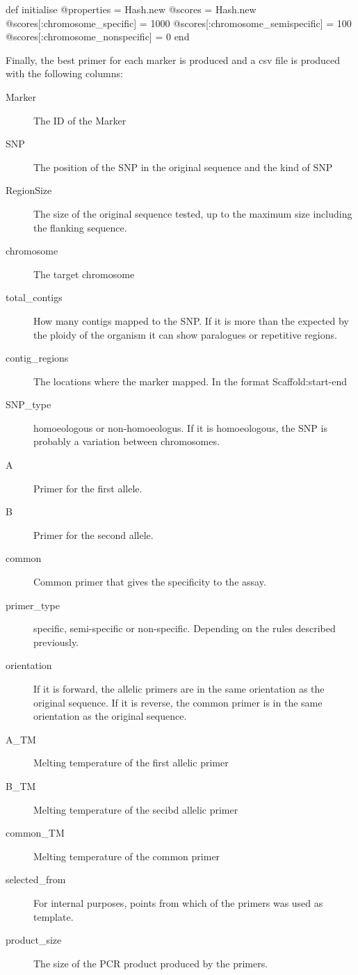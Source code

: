 \begin{code}[language=Ruby,caption={[\texttt{Bio::DB::Primer3::Primer3Record.initialize}]Initialisation of the \texttt{Bio::DB::Primer3::Primer3Record} class, including the default score weights}, label=lst:poly:defScore]
def initialise
  @properties = Hash.new
  @scores = Hash.new
  @scores[:chromosome_specific] = 1000
  @scores[:chromosome_semispecific] = 100
  @scores[:chromosome_nonspecific] = 0
end
\end{code}

Finally, the best primer for each marker is produced and a \acrshort{csv} file is produced with the following columns: 

\begin{description}
\item[Marker] The ID of the Marker
\item[SNP] The position of the SNP in the original sequence and the kind of SNP
\item[RegionSize] The size of the original sequence tested, up to the maximum size including the flanking sequence. 
\item[chromosome] The target chromosome
\item[total\_contigs] How many contigs mapped to the SNP. If it is more than the expected by the ploidy of the organism it can show paralogues or repetitive regions.
\item[contig\_regions] The locations where the marker mapped. In the format Scaffold:start-end
\item[SNP\_type] homoeologous or non-homoeologus. If it is homoeologous, the SNP is probably a variation between chromosomes. 
\item[A] Primer for the first allele.
\item[B] Primer for the second allele.
\item[common] Common primer that gives the specificity to the assay.
\item[primer\_type] specific, semi-specific or non-specific. Depending on the rules described previously. 
\item[orientation] If it is forward, the allelic primers are in the same orientation as the original sequence. If it is reverse, the common primer is in the same orientation as the original sequence.
\item[A\_TM] Melting temperature of the first allelic primer
\item[B\_TM] Melting temperature of the secibd allelic primer
\item[common\_TM] Melting temperature of the common primer
\item[selected\_from] For internal purposes, points from which of the primers was used as template. 
\item[product\_size] The size of the PCR product produced by the primers. 
\end{description}

